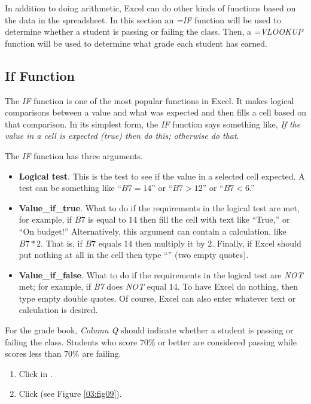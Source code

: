 In addition to doing arithmetic, Excel can do other kinds of functions based on the data in the spreadsheet. In this section an \textit{=IF} function will be used to determine whether a student is passing or failing the class. Then, a \textit{=VLOOKUP} function will be used to determine what grade each student has earned.

\subsection{If Function}

The \textit{IF} function is one of the most popular functions in Excel. It makes logical comparisons between a value and what was expected and then fills a cell based on that comparison. In its simplest form, the \textit{IF} function says something like, \textit{If the value in a cell is expected (true) then do this; otherwise do that}.

The \textit{IF} function has three arguments.

\begin{itemize}
	\item \textbf{Logical test}. This is the test to see if the value in a selected cell expected. A test can be something like ``$ B7=14 $'' or ``$ B7>12 $'' or ``$ B7<6 $.''
	\item \textbf{Value\_if\_true}. What to do if the requirements in the logical test are met, for example, if $ B7 $ is equal to $ 14 $ then fill the cell with text like ``True,'' or ``On budget!'' Alternatively, this argument can contain a calculation, like $ B7*2 $. That is, if $ B7 $ equals $ 14 $ then multiply it by $ 2 $. Finally, if Excel should put nothing at all in the cell then type ``'' (two empty quotes).
	\item \textbf{Value\_if\_false}. What to do if the requirements in the logical test are \textit{NOT} met; for example, if \textit{B7} does \textit{NOT} equal $ 14 $. To have Excel do nothing, then type empty double quotes. Of course, Excel can also enter whatever text or calculation is desired.
\end{itemize}

For the grade book, \textit{Column Q} should indicate whether a student is passing or failing the class. Students who score $ 70\% $ or better are considered passing while scores less than $ 70\% $ are failing.

\begin{enumerate}
	\item Click in .
	\item Click  (see Figure \ref{03:fig09}).
\end{enumerate}

